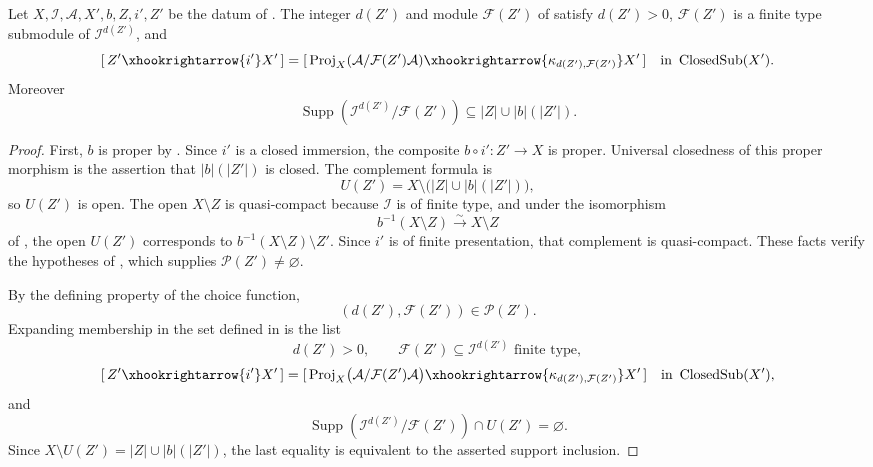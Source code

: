 \begin{lemma}
  \label{lemma:nagata-proj-closed-center-finite-degree}

  Let $X,\mathcal I,\mathcal A,X',b,Z,i',Z'$ be the datum of
  .
  The integer $d(Z')$ and module $\mathcal F(Z')$ of
   satisfy
  $d(Z')>0$, $\mathcal F(Z')$ is a finite
  type submodule of $\mathcal I^{d(Z')}$, and
  \[
    [\,Z'\xhookrightarrow{i'}X'\,]
      =[\,\operatorname{Proj}_X
        (\mathcal A/\mathcal F(Z')\mathcal A)
        \xhookrightarrow{\kappa_{d(Z'),\mathcal F(Z')}}X'\,]
      \quad\text{in }\operatorname{ClosedSub}(X').
  \]
  Moreover
  \[
    \operatorname{Supp}
      (\mathcal I^{d(Z')}/\mathcal F(Z'))
      \subseteq |Z|\cup |b|(|Z'|).
  \]
\end{lemma}

\begin{proof}
  First, $b$ is proper by
  .  Since $i'$ is a closed immersion,
  the composite $b\circ i'\colon Z'\to X$ is proper.  Universal closedness
  of this proper morphism is the assertion that $|b|(|Z'|)$ is closed.  The
  complement formula is
  \[
    U(Z')=X\setminus\bigl(|Z|\cup |b|(|Z'|)\bigr),
  \]
  so $U(Z')$ is open.  The open $X\setminus Z$ is quasi-compact
  because $\mathcal I$ is of finite type, and under the isomorphism
  \[
    b^{-1}(X\setminus Z)\xrightarrow{\sim}X\setminus Z
  \]
  of , the open
  $U(Z')$ corresponds to
  $b^{-1}(X\setminus Z)\setminus Z'$.  Since $i'$ is of finite presentation,
  that complement is quasi-compact.  These facts verify the hypotheses of
  \cite[Tag 0803]{stacks-project}, which supplies
  $\mathcal P(Z')\ne\varnothing$.

  By the defining property of the choice function,
  \[
    (d(Z'),\mathcal F(Z'))\in\mathcal P(Z').
  \]
  Expanding membership in the set defined in
   is the list
  \[
    d(Z')>0,\qquad
    \mathcal F(Z')\subseteq\mathcal I^{d(Z')}
      \text{ finite type},
  \]
  \[
    [\,Z'\xhookrightarrow{i'}X'\,]
      =[\,\operatorname{Proj}_X
        \bigl(\mathcal A/\mathcal F(Z')\mathcal A\bigr)
        \xhookrightarrow{\kappa_{d(Z'),\mathcal F(Z')}}X'\,]
      \quad\text{in }\operatorname{ClosedSub}(X'),
  \]
  and
  \[
    \operatorname{Supp}
      (\mathcal I^{d(Z')}/\mathcal F(Z'))
      \cap U(Z')=\varnothing.
  \]
  Since $X\setminus U(Z')=|Z|\cup |b|(|Z'|)$, the last equality is equivalent
  to the asserted support inclusion.
\end{proof}

